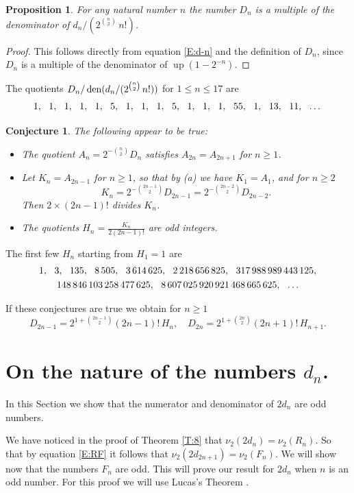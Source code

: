 \documentclass[10pt]{amsart}
\newtheorem{prop}[thm]{Proposition}
\newtheorem{conj}[thm]{Conjecture}
\theoremstyle{definition}
\theoremstyle{remark}
\DeclareMathOperator\up{up}
\def\nn{\mskip12mu}
\begin{document}
\begin{prop}
For any natural number $n$ the number $D_n$ is a multiple of the denominator of 
$d_n/(2^{\binom{n}{2}}\,n!)$.
\end{prop}
\begin{proof}
This follows directly from equation \eqref{E:d-n} and the definition of 
$D_n$, since $D_n$ is a multiple of the denominator of $\up(1-2^{-n})$.
\end{proof}

The quotients $D_n/\operatorname{den}(d_n/(2^{\binom{n}{2}}\,n!))$ for $1\le n\le 17$ are
\[1,\nn 1,\nn 1,\nn 1,\nn 1,\nn 5,\nn 1,\nn 1,\nn 1,\nn 5,\nn 1,\nn 1,\nn 1,\nn 55,\nn1,\nn13,\nn11,\nn\dots\]

\begin{conj}\label{C:nueva}
The following appear to be true:
\begin{itemize}
\item[(a)]
The quotient $A_n=2^{-\binom{n}{2}}D_n$ satisfies $A_{2n}=A_{2n+1}$ for $n\ge1$.
\item[(b)] Let $K_{n}=A_{2n-1}$ for $n\ge1$, so that 
by (a) we have $K_1=A_1$, and for $n\ge2$
\[K_n=2^{-\binom{2n-1}{2}}D_{2n-1}=2^{-\binom{2n-2}{2}}D_{2n-2}.\]
Then $2\times(2n-1)!$ divides $K_n$.
\item[(c)] The quotients $H_n=\frac{K_n}{2(2n-1)!}$ are odd integers.
\end{itemize}
\end{conj}

The first few $H_n$ starting from $H_1=1$ are
\begin{gather*}
1,\nn 3,\nn 135,\nn 8\,505,\nn 3\,614\,625,\nn 2\,218\,656\,825,\nn 317\,988\,989\,443\,125,\\
148\,846\,103\,258\,477\,625,\nn 8\,607\,025\,920\,921\,468\,665\,625,\nn \dots
\end{gather*}

If these conjectures are true we obtain for $n\ge1$
\[D_{2n-1}=2^{1+\binom{2n-1}{2}}(2n-1)!\, H_n,\quad D_{2n}=
2^{1+\binom{2n}{2}}(2n+1)!\, H_{n+1}.\]

\section{On the nature of the numbers $d_n$.}

In this Section we show that the numerator and denominator of $2d_n$ are odd numbers.


We have noticed in the proof 
of Theorem \ref{T:8} that $\nu_2(2d_n)=\nu_2(R_n)$. So that by equation
\eqref{E:RF} it follows that $\nu_2(2d_{2n+1})=\nu_2(F_n)$. We will show
now that the numbers $F_n$ are odd.  
This will prove our result for $2d_n$ when $n$ is an odd number.
For this proof we will use Lucas's Theorem \cite{MR0023257}.
\end{document}
